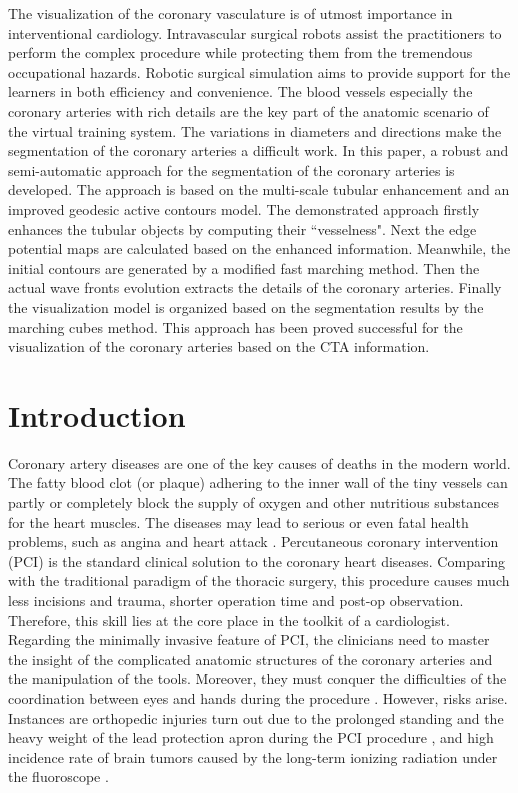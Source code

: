 
The visualization of the coronary vasculature is of utmost importance in interventional cardiology.
Intravascular surgical robots assist the practitioners to perform the complex procedure while protecting them from the tremendous occupational hazards.
Robotic surgical simulation aims to provide support for the learners in both efficiency and convenience.
The blood vessels especially the coronary arteries with rich details are the key part of the anatomic scenario of the virtual training system.
The variations in diameters and directions make the segmentation of the coronary arteries a difficult work.
In this paper, a robust and semi-automatic approach for the segmentation of the coronary arteries is developed.
The approach is based on the multi-scale tubular enhancement and an improved geodesic active contours model.
The demonstrated approach firstly enhances the tubular objects by computing their ``vesselness".
Next the edge potential maps are calculated based on the enhanced information.
Meanwhile, the initial contours are generated by a modified fast marching method.
Then the actual wave fronts evolution extracts the details of the coronary arteries.
Finally the visualization model is organized based on the segmentation results by the marching cubes method.
This approach has been proved successful for the visualization of the coronary arteries based on the CTA information.

\section{Introduction}
\label{sec4_0}

Coronary artery diseases are one of the key causes of deaths in the modern world. %
The fatty blood clot (or plaque) adhering to the inner wall of the tiny vessels can partly or completely block the supply of oxygen and other nutritious substances for the heart muscles.
The diseases may lead to serious or even fatal health problems, such as angina and heart attack \cite{OCallaghan2002}.
Percutaneous coronary intervention (PCI) is the standard clinical solution to the coronary heart diseases.
Comparing with the traditional paradigm of the thoracic surgery, this procedure causes much less incisions and trauma, shorter operation time and post-op observation.
Therefore, this skill lies at the core place in the toolkit of a cardiologist.
Regarding the minimally invasive feature of PCI, the clinicians need to master the insight of the complicated anatomic structures of the coronary arteries and the manipulation of the tools.
Moreover, they must conquer the difficulties of the coordination between eyes and hands during the procedure \cite{Li2012CUHK}.
However, risks arise.
Instances are orthopedic injuries turn out due to the prolonged standing and the heavy weight of the lead protection apron during the PCI procedure \cite{Goldstein2004}, and high incidence rate of brain tumors caused by the long-term ionizing radiation under the fluoroscope \cite{Roguin2012}.

